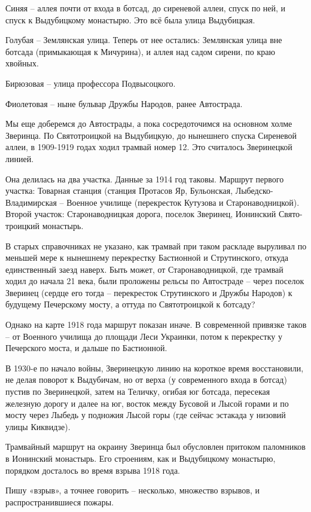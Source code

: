 Синяя – аллея почти от входа в ботсад, до сиреневой аллеи, спуск по ней, и спуск к Выдубицкому монастырю. Это всё была улица Выдубицкая.

Голубая – Землянская улица. Теперь от нее остались: Землянская улица вне ботсада (примыкающая к Мичурина), и аллея над садом сирени, по краю хвойных.

Бирюзовая – улица профессора Подвысоцкого.

Фиолетовая – ныне бульвар Дружбы Народов, ранее Автострада.

Мы еще доберемся до Автострады, а пока сосредоточимся на основном холме Зверинца. По Святотроицкой на Выдубицкую, до нынешнего спуска Сиреневой аллеи, в 1909-1919 годах ходил трамвай номер 12. Это считалось Зверинецкой линией.

Она делилась на два участка. Данные за 1914 год таковы. Маршрут первого участка: Товарная станция (станция Протасов Яр, Бульонская, Лыбедско-Владимирская – Военное училище (перекресток Кутузова и Старонаводницкой). Второй участок: Старонаводницкая дорога, поселок Зверинец, Ионинский Свято-троицкий монастырь.

В старых справочниках не указано, как трамвай при таком раскладе выруливал по меньшей мере к нынешнему перекрестку Бастионной и Струтинского, откуда единственный заезд наверх. Быть может, от Старонаводницкой, где трамвай ходил до начала 21 века, были проложены рельсы по Автостраде – через поселок Зверинец (сердце его тогда – перекресток Струтинского и Дружбы Народов) к будущему Печерскому мосту, а оттуда по Святотроицкой к ботсаду?

Однако на карте 1918 года маршрут показан иначе. В современной привязке таков – от Военного училища до площади Леси Украинки, потом к перекрестку у Печерского моста, и дальше по Бастионной.

В 1930-е по начало войны, Зверинецкую линию на короткое время восстановили, не делая поворот к Выдубичам, но от верха (у современного входа в ботсад) пустив по Зверинецкой, затем на Теличку, огибая юг ботсада, пересекая железную дорогу и далее на юг, восток между Бусовой и Лысой горами и по мосту через Лыбедь у подножия Лысой горы (где сейчас эстакада у низовий улицы Киквидзе).

Трамвайный маршрут на окраину Зверинца был обусловлен притоком паломников в Ионинский монастырь. Его строениям, как и Выдубицкому монастырю, порядком досталось во время взрыва 1918 года.

Пишу «взрыв», а точнее говорить – несколько, множество взрывов, и распространившиеся пожары.

